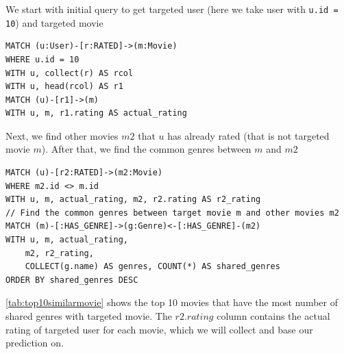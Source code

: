 \documentclass{article}
\begin{document}
We start with initial query to get targeted user (here we take user with \texttt{u.id = 10}) and targeted movie 

\begin{verbatim}
MATCH (u:User)-[r:RATED]->(m:Movie)
WHERE u.id = 10
WITH u, collect(r) AS rcol
WITH u, head(rcol) AS r1
MATCH (u)-[r1]->(m)
WITH u, m, r1.rating AS actual_rating
\end{verbatim}

Next, we find other movies $m2$ that $u$ has already rated (that is not targeted movie $m$). After that, we find the common genres between $m$ and $m2$

\begin{verbatim}
MATCH (u)-[r2:RATED]->(m2:Movie)
WHERE m2.id <> m.id
WITH u, m, actual_rating, m2, r2.rating AS r2_rating
// Find the common genres between target movie m and other movies m2
MATCH (m)-[:HAS_GENRE]->(g:Genre)<-[:HAS_GENRE]-(m2)
WITH u, m, actual_rating, 
    m2, r2_rating, 
    COLLECT(g.name) AS genres, COUNT(*) AS shared_genres
ORDER BY shared_genres DESC
\end{verbatim}

\autoref{tab:top10similarmovie} shows the top 10 movies that have the most number of shared genres with targeted movie. The $r2.rating$ column contains the actual rating of targeted user for each movie, which we will collect and base our prediction on. 
\end{document}
